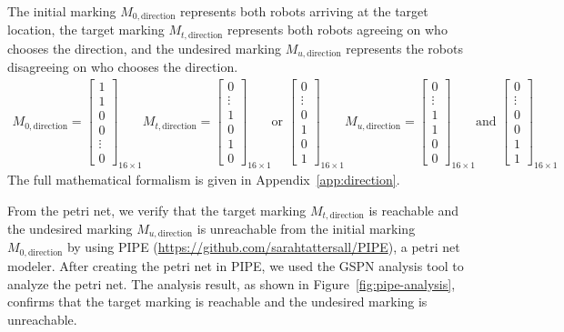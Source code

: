 \documentclass[12pt,a4paper]{article}
\begin{document}
The initial marking $M_{0, \text{direction}}$ represents both robots arriving at the target location, the target marking $M_{t, \text{direction}}$ represents both robots agreeing on who chooses the direction, and the undesired marking $M_{u, \text{direction}}$ represents the robots disagreeing on who chooses the direction.
\begin{align*}
    M_{0, \text{direction}} = \begin{bmatrix}
        1 \\ 1 \\ 0 \\ 0 \\ \vdots \\ 0
    \end{bmatrix}_{16 \times 1}
    M_{t, \text{direction}} = \begin{bmatrix}
        0 \\ \vdots \\ 1 \\ 0 \\ 1 \\ 0
    \end{bmatrix}_{16 \times 1} \text{or } 
    \begin{bmatrix}
        0 \\ \vdots \\ 0 \\ 1 \\ 0 \\ 1
    \end{bmatrix}_{16 \times 1}
    M_{u, \text{direction}} = \begin{bmatrix}
        0 \\ \vdots \\ 1 \\ 1 \\ 0 \\ 0
    \end{bmatrix}_{16 \times 1} \text{and } 
    \begin{bmatrix}
        0 \\ \vdots \\ 0 \\ 0 \\ 1 \\ 1
    \end{bmatrix}_{16 \times 1}
\end{align*}
The full mathematical formalism is given in Appendix~\ref{app:direction}.

From the petri net, we verify that the target marking $M_{t, \text{direction}}$ is reachable and the undesired marking $M_{u, \text{direction}}$ is unreachable from the initial marking $M_{0, \text{direction}}$ by using PIPE (\url{https://github.com/sarahtattersall/PIPE}), a petri net modeler. After creating the petri net in PIPE, we used the GSPN analysis tool to analyze the petri net. The analysis result, as shown in Figure~\ref{fig:pipe-analysis}, confirms that the target marking is reachable and the undesired marking is unreachable. 
\end{document}
